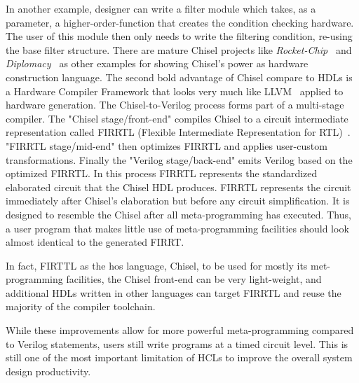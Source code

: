 In another example, designer can write a filter module which takes, as a parameter, a higher-order-function that creates the condition checking hardware.
The user of this module then only needs to write the filtering condition, re-using the base filter structure.
There are mature Chisel projects like \emph{Rocket-Chip~\cite{rocket-chip}} and \emph{Diplomacy~\cite{diplomacy}} as other examples for showing Chisel's power as hardware construction language.
The second bold advantage of Chisel compare to HDLs is a Hardware Compiler Framework that looks very much like LLVM~\cite{llvm} applied to hardware generation.
The Chisel-to-Verilog process forms part of a multi-stage compiler.
The "Chisel stage/front-end" compiles Chisel to a circuit intermediate representation called FIRRTL (Flexible Intermediate Representation for RTL)~\cite{firrtl}.
"FIRRTL stage/mid-end" then optimizes FIRRTL and applies user-custom transformations. Finally the "Verilog stage/back-end" emits Verilog based on the optimized FIRRTL.
In this process FIRRTL represents the standardized elaborated circuit that the Chisel HDL produces.
FIRRTL represents the circuit immediately after Chisel's elaboration but before any circuit simplification.
It is designed to resemble the Chisel after all meta-programming has executed. Thus, a user program that makes little use of meta-programming facilities should look almost identical to the generated FIRRT.

In fact, FIRTTL as the hos language, Chisel, to be used for mostly its met-programming facilities, the Chisel front-end can be very light-weight, and additional HDLs written in other languages can target FIRRTL and reuse the majority of the compiler toolchain.


While these improvements allow for more powerful meta-programming compared to Verilog  statements, users still write programs at a timed circuit level. This is still one of the most important limitation of HCLs to improve the overall system design productivity.

